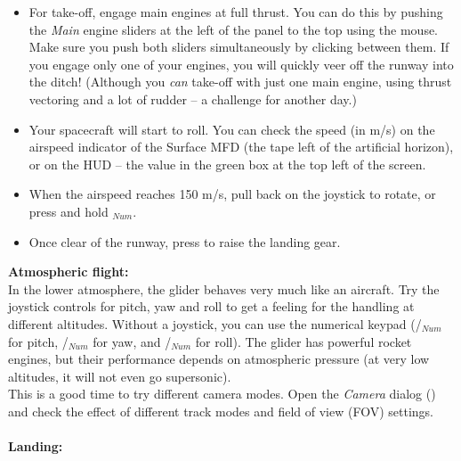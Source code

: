\documentclass[Orbiter User Manual.tex]{subfiles}
\begin{document}
\begin{itemize}
\item For take-off, engage main engines at full thrust. You can do this by pushing the \textit{Main} engine sliders at the left of the panel to the top using the mouse. Make sure you push both sliders simultaneously by clicking between them. If you engage only one of your engines, you will quickly veer off the runway into the ditch! (Although you \textit{can} take-off with just one main engine, using thrust vectoring and a lot of rudder – a challenge for another day.)
\item Your spacecraft will start to roll. You can check the speed (in m/s) on the airspeed indicator of the Surface MFD (the tape left of the artificial horizon), or on the HUD – the value in the green box at the top left of the screen.
\item When the airspeed reaches 150 m/s, pull back on the joystick to rotate, or press and hold $_{Num}$.
\item Once clear of the runway, press  to raise the landing gear.
\end{itemize}

\noindent
\begin{figure}[H]
	\centering
\end{figure}

\noindent
\textbf{Atmospheric flight:}\\
In the lower atmosphere, the glider behaves very much like an aircraft. Try the joystick controls for pitch, yaw and roll to get a feeling for the handling at different altitudes. Without a joystick, you can use the numerical keypad (/$_{Num}$ for pitch, /$_{Num}$ for yaw, and /$_{Num}$ for roll). The glider has powerful rocket engines, but their performance depends on atmospheric pressure (at very low altitudes, it will not even go supersonic).\\
This is a good time to try different camera modes. Open the \textit{Camera} dialog (\Ctrl{}) and check the effect of different track modes and field of view (FOV) settings.\\
\\
\textbf{Landing:}
\end{document}
